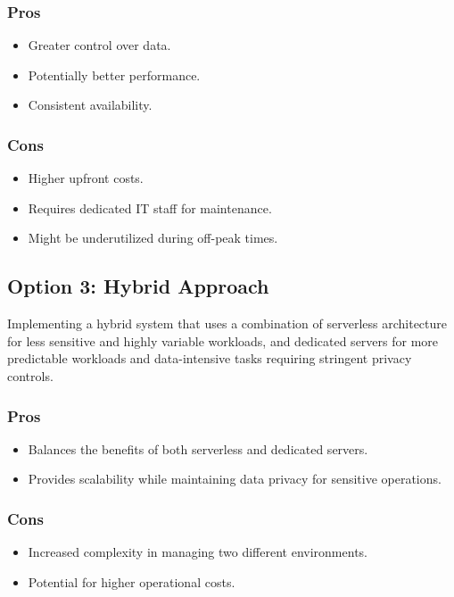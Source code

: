 \subsubsection*{Pros}
\begin{itemize}
    \item Greater control over data.
    \item Potentially better performance.
    \item Consistent availability.
\end{itemize}
\subsubsection*{Cons}
\begin{itemize}
    \item Higher upfront costs.
    \item Requires dedicated IT staff for maintenance.
    \item Might be underutilized during off-peak times.
\end{itemize}

\subsection*{Option 3: Hybrid Approach}
Implementing a hybrid system that uses a combination of serverless architecture for less sensitive and highly variable workloads, and dedicated servers for more predictable workloads and data-intensive tasks requiring stringent privacy controls.
\subsubsection*{Pros}
\begin{itemize}
    \item Balances the benefits of both serverless and dedicated servers.
    \item Provides scalability while maintaining data privacy for sensitive operations.
\end{itemize}
\subsubsection*{Cons}
\begin{itemize}
    \item Increased complexity in managing two different environments.
    \item Potential for higher operational costs.
\end{itemize}

